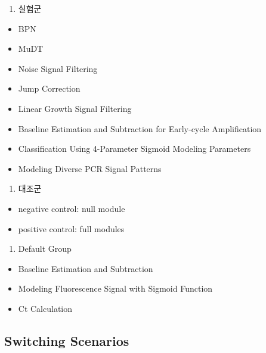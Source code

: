 \documentclass[
  letterpaper,
  DIV=11,
  numbers=noendperiod]{scrartcl}
\providecommand{\tightlist}{%
  \setlength{\itemsep}{0pt}\setlength{\parskip}{0pt}}\usepackage{longtable,booktabs,array}
\begin{document}
\begin{enumerate}
\def\labelenumi{\arabic{enumi}.}
\tightlist
\item
  실험군
\end{enumerate}

\begin{itemize}
\tightlist
\item
  BPN
\item
  MuDT
\item
  Noise Signal Filtering
\item
  Jump Correction
\item
  Linear Growth Signal Filtering
\item
  Baseline Estimation and Subtraction for Early-cycle Amplification
\item
  Classification Using 4-Parameter Sigmoid Modeling Parameters
\item
  Modeling Diverse PCR Signal Patterns
\end{itemize}

\begin{enumerate}
\def\labelenumi{\arabic{enumi}.}
\setcounter{enumi}{1}
\tightlist
\item
  대조군
\end{enumerate}

\begin{itemize}
\tightlist
\item
  negative control: null module
\item
  positive control: full modules
\end{itemize}

\begin{enumerate}
\def\labelenumi{\arabic{enumi}.}
\setcounter{enumi}{2}
\tightlist
\item
  Default Group
\end{enumerate}

\begin{itemize}
\tightlist
\item
  Baseline Estimation and Subtraction
\item
  Modeling Fluorescence Signal with Sigmoid Function
\item
  Ct Calculation
\end{itemize}

\hypertarget{switching-scenarios}{%
\subsection{Switching Scenarios}\label{switching-scenarios}}
\end{document}
